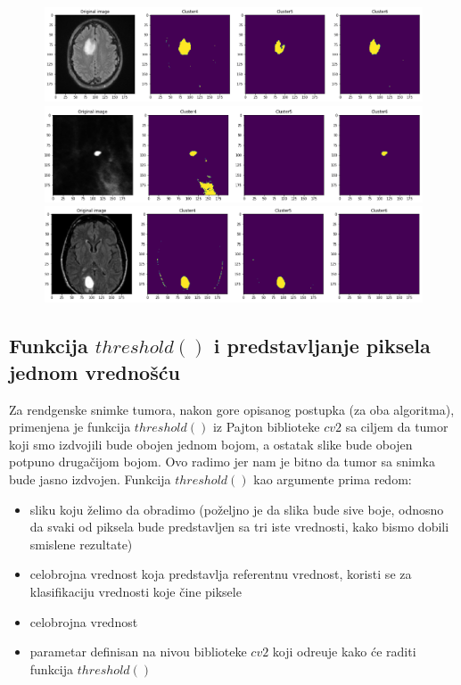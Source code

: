 \documentclass{article}
\begin{document}
\newpage

\begin{figure}[h!]
\centerline{\includegraphics[scale=0.45]{images/segmented_k_means_tumor4.png}}
\centerline{\includegraphics[scale=0.45]{images/segmented_k_means_tumor5.png}}
\centerline{\includegraphics[scale=0.45]{images/segmented_k_means_tumor6.png}}
\end{figure}


\subsection{\selectfont Funkcija $ threshold() $ i predstavljanje piksela jednom vredno\v{s}\'{c}u}
\label{text:threshold}

Za rendgenske snimke tumora, nakon gore opisanog postupka (za oba algoritma), primenjena je funkcija $ threshold() $ iz Pajton biblioteke $ cv2 $ sa ciljem da tumor koji smo izdvojili bude obojen jednom bojom, a ostatak slike bude obojen potpuno druga\v{c}ijom bojom. Ovo radimo jer nam je bitno da tumor sa snimka bude jasno izdvojen. Funkcija $ threshold() $ kao argumente prima redom:
\begin{itemize}
\item sliku koju \v{z}elimo da obradimo (po\v{z}eljno je da slika bude sive boje, odnosno da svaki od piksela bude predstavljen sa tri iste vrednosti, kako bismo dobili smislene rezultate)
\item celobrojna vrednost koja predstavlja referentnu vrednost, koristi se za klasifikaciju vrednosti koje \v{c}ine piksele
\item celobrojna vrednost
\item parametar definisan na nivou biblioteke $ cv2 $ koji odre\dj uje kako \'{c}e raditi funkcija $ threshold() $
\end{itemize}
\end{document}
